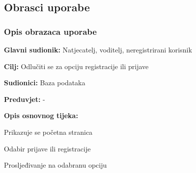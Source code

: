 			\eject 
			
			
				
			\subsection{Obrasci uporabe}
				
				
				\subsubsection{Opis obrazaca uporabe}
					

					\noindent {}
					\begin{packed_item}
	
						\item \textbf{Glavni sudionik: }Natjecatelj, voditelj, neregistrirani korisnik
						\item  \textbf{Cilj:} Odlučiti se za opciju registracije ili prijave
						\item  \textbf{Sudionici:} Baza podataka
						\item  \textbf{Preduvjet:} -
						\item  \textbf{Opis osnovnog tijeka:}
						
						\item[] \begin{packed_enum}
	
							\item Prikazuje se početna stranica
							\item Odabir prijave ili registracije
							\item Prosljeđivanje na odabranu opciju
							
						\end{packed_enum}
					\end{packed_item}
					
